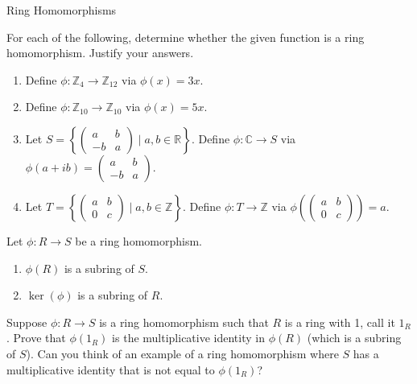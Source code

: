 \begin{section}{Ring Homomorphisms}
\begin{problem}
For each of the following, determine whether the given function is a ring homomorphism.  Justify your answers.
\begin{enumerate}[label=\textrm{(\alph*)}]
\item Define $\phi:\mathbb{Z}_4\to \mathbb{Z}_{12}$ via $\phi(x)=3x$.
\item Define $\phi:\mathbb{Z}_{10}\to \mathbb{Z}_{10}$ via $\phi(x)=5x$.
\item Let $\displaystyle S=\left\{\begin{pmatrix}a & b\\ -b & a\end{pmatrix}\mid a, b\in \mathbb{R}\right\}$.  Define $\phi:\mathbb{C}\to S$ via $\displaystyle \phi(a+ib)=\begin{pmatrix}a & b\\ -b & a\end{pmatrix}$.
\item Let $\displaystyle T=\left\{\begin{pmatrix}a & b\\ 0 & c\end{pmatrix}\mid a, b\in \mathbb{Z}\right\}$. Define $\phi:T\to \mathbb{Z}$ via $\displaystyle \phi\left(\begin{pmatrix}a & b\\ 0 & c\end{pmatrix}\right)=a$.
\end{enumerate}
\end{problem}

\begin{theorem}\label{thm:kernelsubring}
Let $\phi:R\to S$ be a ring homomorphism.
\begin{enumerate}[label=\textrm{(\alph*)}]
\item $\phi(R)$ is a subring of $S$.
\item $\ker(\phi)$ is a subring of $R$.
\end{enumerate}
\end{theorem}

\begin{problem}
Suppose $\phi:R\to S$ is a ring homomorphism such that $R$ is a ring with 1, call it $1_R$.  Prove that $\phi(1_R)$ is the multiplicative identity in $\phi(R)$ (which is a subring of $S$).  Can you think of an example of a ring homomorphism where $S$ has a multiplicative identity that is not equal to $\phi(1_R)$?
\end{problem}


\end{section}
